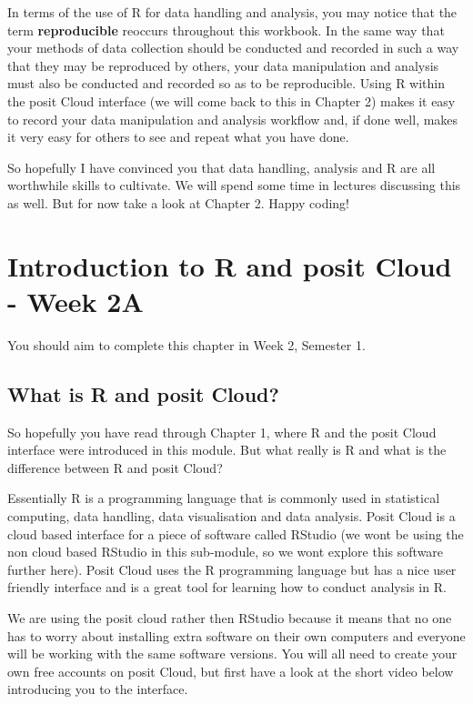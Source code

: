 \documentclass[
]{book}
\begin{document}
In terms of the use of R for data handling and analysis, you may notice that the term \textbf{reproducible} reoccurs throughout this workbook. In the same way that your methods of data collection should be conducted and recorded in such a way that they may be reproduced by others, your data manipulation and analysis must also be conducted and recorded so as to be reproducible. Using R within the posit Cloud interface (we will come back to this in Chapter 2) makes it easy to record your data manipulation and analysis workflow and, if done well, makes it very easy for others to see and repeat what you have done.

So hopefully I have convinced you that data handling, analysis and R are all worthwhile skills to cultivate. We will spend some time in lectures discussing this as well. But for now take a look at Chapter 2. Happy coding!

\hypertarget{introduction-to-r-and-posit-cloud---week-2a}{%
\chapter{Introduction to R and posit Cloud - Week 2A}\label{introduction-to-r-and-posit-cloud---week-2a}}

You should aim to complete this chapter in Week 2, Semester 1.

\hypertarget{what-is-r-and-posit-cloud}{%
\section{What is R and posit Cloud?}\label{what-is-r-and-posit-cloud}}

So hopefully you have read through Chapter 1, where R and the posit Cloud interface were introduced in this module. But what really is R and what is the difference between R and posit Cloud?

Essentially R is a programming language that is commonly used in statistical computing, data handling, data visualisation and data analysis. Posit Cloud is a cloud based interface for a piece of software called RStudio (we wont be using the non cloud based RStudio in this sub-module, so we wont explore this software further here). Posit Cloud uses the R programming language but has a nice user friendly interface and is a great tool for learning how to conduct analysis in R.

We are using the posit cloud rather then RStudio because it means that no one has to worry about installing extra software on their own computers and everyone will be working with the same software versions. You will all need to create your own free accounts on posit Cloud, but first have a look at the short video below introducing you to the interface.
\end{document}
